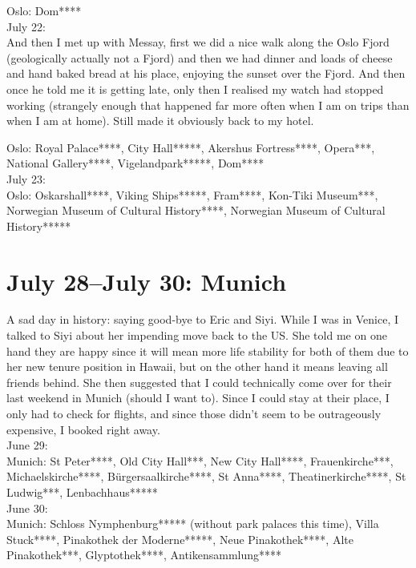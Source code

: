 Oslo: Dom****\\

July 22:\\

And then I met up with Messay, first we did a nice walk along the Oslo Fjord (geologically actually not a Fjord) and then we had dinner and loads of cheese and hand baked bread at his place, enjoying the sunset over the Fjord. And then once he told me it is getting late, only then I realised my watch had stopped working (strangely enough that happened far more often when I am on trips than when I am at home).  Still made it obviously back to my hotel.

Oslo: Royal Palace****, City Hall*****, Akershus Fortress****, Opera***, National Gallery****, Vigelandpark*****, Dom****\\

July 23:\\
Oslo: Oskarshall****, Viking Ships*****, Fram****, Kon-Tiki Museum***, Norwegian Museum of Cultural History****, Norwegian Museum of Cultural History*****

\section{July 28--July 30: Munich}
\label{Munich2017}

A sad day in history: saying good-bye to Eric and Siyi. While I was in Venice, I talked to Siyi about her impending move back to the US. She told me on one hand they are happy since it will mean more life stability for both of them due to her new tenure position in Hawaii, but on the other hand it means leaving all friends behind. She then suggested that I could technically come over for their last weekend in Munich (should I want to). Since I could stay at their place, I only had to check for flights, and since those didn't seem to be outrageously expensive, I booked right away.\\

June 29:\\
Munich: St Peter****, Old City Hall***, New City Hall****, Frauenkirche***, Michaelskirche****, B\"urgersaalkirche****, St Anna****, Theatinerkirche****, St Ludwig***, Lenbachhaus*****\\

June 30:\\
Munich: Schloss Nymphenburg***** (without park palaces this time), Villa Stuck****, Pinakothek der Moderne*****, Neue Pinakothek****, Alte Pinakothek***, Glyptothek****, Antikensammlung****\\

